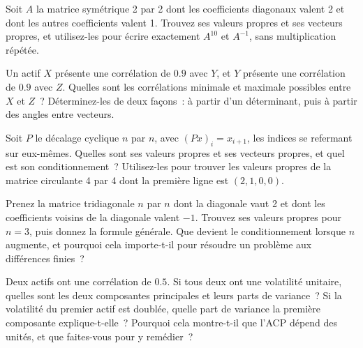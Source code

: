 \begin{question}\label{iq:iv1:linear-algebra:5}
Soit $A$ la matrice symétrique 2 par 2 dont les coefficients diagonaux valent 2 et dont les autres coefficients valent 1. Trouvez ses valeurs propres et ses vecteurs propres, et utilisez-les pour écrire exactement $A^{10}$ et $A^{-1}$, sans multiplication répétée.
\end{question}

\begin{question}\label{iq:iv1:linear-algebra:6}
Un actif $X$ présente une corrélation de $0.9$ avec $Y$, et $Y$ présente une corrélation de $0.9$ avec $Z$. Quelles sont les corrélations minimale et maximale possibles entre $X$ et $Z$~? Déterminez-les de deux façons~: à partir d'un déterminant, puis à partir des angles entre vecteurs.
\end{question}

\begin{question}\label{iq:iv1:linear-algebra:7}
Soit $P$ le décalage cyclique $n$ par $n$, avec $(Px)_i = x_{i + 1}$, les indices se refermant sur eux-mêmes. Quelles sont ses valeurs propres et ses vecteurs propres, et quel est son conditionnement~? Utilisez-les pour trouver les valeurs propres de la matrice circulante 4 par 4 dont la première ligne est $(2, 1, 0, 0)$.
\end{question}

\begin{question}\label{iq:iv1:linear-algebra:8}
Prenez la matrice tridiagonale $n$ par $n$ dont la diagonale vaut 2 et dont les coefficients voisins de la diagonale valent $-1$. Trouvez ses valeurs propres pour $n = 3$, puis donnez la formule générale. Que devient le conditionnement lorsque $n$ augmente, et pourquoi cela importe-t-il pour résoudre un problème aux différences finies~?
\end{question}

\begin{question}\label{iq:iv1:linear-algebra:9}
Deux actifs ont une corrélation de $0.5$. Si tous deux ont une volatilité unitaire, quelles sont les deux composantes principales et leurs parts de variance~? Si la volatilité du premier actif est doublée, quelle part de variance la première composante explique-t-elle~? Pourquoi cela montre-t-il que l'ACP dépend des unités, et que faites-vous pour y remédier~?
\end{question}

